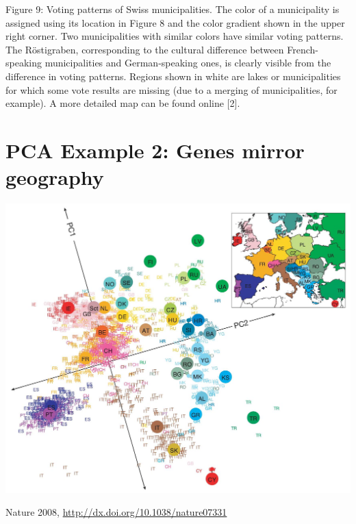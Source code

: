 \documentclass[10pt]{article}
\begin{document}
Figure 9: Voting patterns of Swiss municipalities. The color of a municipality is assigned using its location in Figure 8 and the color gradient shown in the upper right corner. Two municipalities with similar colors have similar voting patterns. The Röstigraben, corresponding to the cultural difference between French-speaking municipalities and German-speaking ones, is clearly visible from the difference in voting patterns. Regions shown in white are lakes or municipalities for which some vote results are missing (due to a merging of municipalities, for example). A more detailed map can be found online [2].

\section*{PCA Example 2: Genes mirror geography}
\begin{center}
\includegraphics[max width=\textwidth]{2024_01_08_e090cb7d953bac87fc33g-05}
\end{center}

Nature 2008, \href{http://dx.doi.org/10.1038/nature07331}{http://dx.doi.org/10.1038/nature07331}
\end{document}
